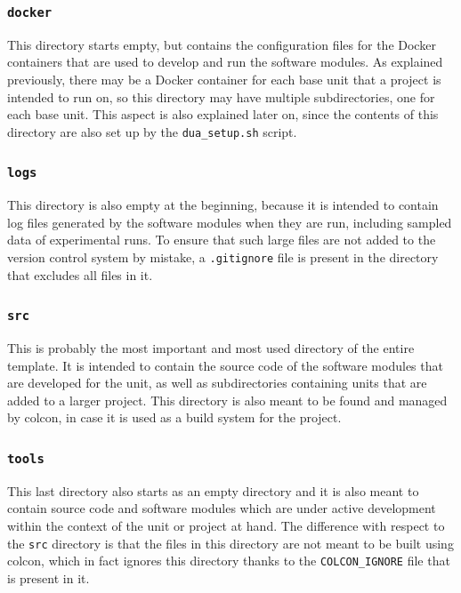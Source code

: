 \subsubsection{\texttt{docker}}
\label{sec:dua_template_layout_docker}
This directory starts empty, but contains the configuration files for the Docker containers that are used to develop and run the software modules. As explained previously, there may be a Docker container for each base unit that a project is intended to run on, so this directory may have multiple subdirectories, one for each base unit. This aspect is also explained later on, since the contents of this directory are also set up by the \texttt{dua\_setup.sh} script.

\subsubsection{\texttt{logs}}
\label{sec:dua_template_layout_logs}
This directory is also empty at the beginning, because it is intended to contain log files generated by the software modules when they are run, including sampled data of experimental runs. To ensure that such large files are not added to the version control system by mistake, a \texttt{.gitignore} file is present in the directory that excludes all files in it.

\subsubsection{\texttt{src}}
\label{sec:dua_template_layout_src}
This is probably the most important and most used directory of the entire template. It is intended to contain the source code of the software modules that are developed for the unit, as well as subdirectories containing units that are added to a larger project. This directory is also meant to be found and managed by colcon, in case it is used as a build system for the project.

\subsubsection{\texttt{tools}}
\label{sec:dua_template_layout_tools}
This last directory also starts as an empty directory and it is also meant to contain source code and software modules which are under active development within the context of the unit or project at hand. The difference with respect to the \texttt{src} directory is that the files in this directory are not meant to be built using colcon, which in fact ignores this directory thanks to the \texttt{COLCON\_IGNORE} file that is present in it.

